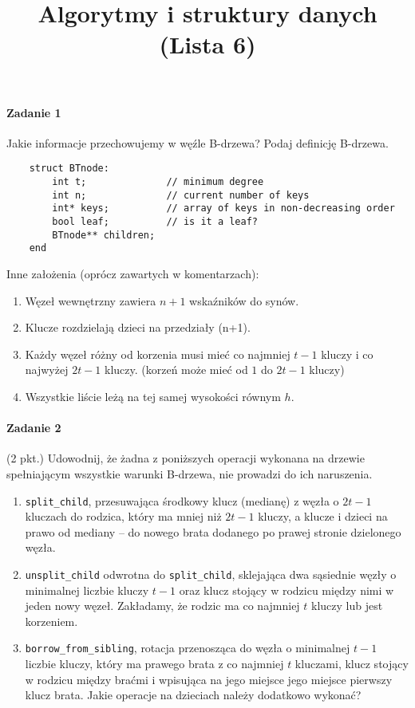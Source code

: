 \documentclass[18pt]{extarticle}
\begin{document}
\large
{}\selectfont

\title{Algorytmy i struktury danych (Lista 6)}
\date{}
\maketitle

\paragraph{Zadanie 1} Jakie informacje przechowujemy w węźle B-drzewa? Podaj definicję B-drzewa. \\

\begin{lstlisting}
    struct BTnode:
        int t;              // minimum degree
        int n;              // current number of keys
        int* keys;          // array of keys in non-decreasing order
        bool leaf;          // is it a leaf?
        BTnode** children;
    end
\end{lstlisting}
Inne założenia (oprócz zawartych w komentarzach):
\begin{enumerate}
    \item Węzeł wewnętrzny zawiera $n+1$ wskaźników do synów.
    \item Klucze rozdzielają dzieci na przedziały (n+1).
    \item Każdy węzeł różny od korzenia musi mieć co najmniej $t-1$ kluczy i co najwyżej $2t-1$ kluczy. (korzeń może mieć od $1$ do $2t-1$ kluczy)
    \item Wszystkie liście leżą na tej samej wysokości równym $h$.
\end{enumerate}

\paragraph{Zadanie 2} (2 pkt.) Udowodnij, że żadna z poniższych operacji wykonana na drzewie spełniającym wszystkie warunki B-drzewa, nie prowadzi do ich naruszenia.
\begin{enumerate}[label=(\alph*)]
    \item \verb|split_child|, przesuwająca środkowy klucz (medianę) z węzła o $2t-1$ kluczach do rodzica, który ma
          mniej niż $2t-1$ kluczy, a klucze i dzieci na prawo od mediany -- do nowego brata dodanego po prawej stronie dzielonego węzła.
    \item \verb|unsplit_child| odwrotna do \verb|split_child|, sklejająca dwa sąsiednie węzły o minimalnej liczbie
          kluczy $t-1$ oraz klucz stojący w rodzicu między nimi w jeden nowy węzeł. Zakładamy, że rodzic ma co
          najmniej $t$ kluczy lub jest korzeniem.
    \item \verb|borrow_from_sibling|, rotacja przenosząca do węzła o minimalnej $t-1$ liczbie kluczy, który ma
          prawego brata z co najmniej $t$ kluczami, klucz stojący w rodzicu między braćmi i wpisująca na jego miejsce jego miejsce pierwszy klucz brata. Jakie operacje na dzieciach należy dodatkowo wykonać?
\end{enumerate}
\end{document}
